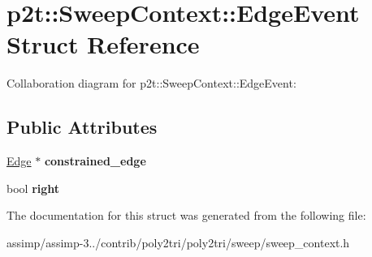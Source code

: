\hypertarget{structp2t_1_1_sweep_context_1_1_edge_event}{\section{p2t\+:\+:Sweep\+Context\+:\+:Edge\+Event Struct Reference}
\label{structp2t_1_1_sweep_context_1_1_edge_event}
}


Collaboration diagram for p2t\+:\+:Sweep\+Context\+:\+:Edge\+Event\+:
\subsection*{Public Attributes}
\begin{DoxyCompactItemize}
\item 
\hypertarget{structp2t_1_1_sweep_context_1_1_edge_event_a12627007e9501c178820e86dbf40967b}{\hyperlink{structp2t_1_1_edge}{Edge} $\ast$ {\bfseries constrained\+\_\+edge}}\label{structp2t_1_1_sweep_context_1_1_edge_event_a12627007e9501c178820e86dbf40967b}

\item 
\hypertarget{structp2t_1_1_sweep_context_1_1_edge_event_a7970343e9690e97ad56d1f6e47ba0c5d}{bool {\bfseries right}}\label{structp2t_1_1_sweep_context_1_1_edge_event_a7970343e9690e97ad56d1f6e47ba0c5d}

\end{DoxyCompactItemize}


The documentation for this struct was generated from the following file\+:\begin{DoxyCompactItemize}
\item 
assimp/assimp-\/3../contrib/poly2tri/poly2tri/sweep/sweep\+\_\+context.\+h\end{DoxyCompactItemize}
